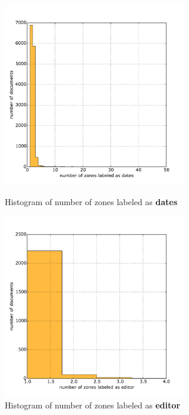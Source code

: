 \begin{figure}
\centering
\begin{minipage}[t!]{0.48\linewidth}
  \includegraphics[width=8cm]{plots/dates_histogram}
  \caption{Histogram of number of zones labeled as \textbf{dates}}
  \label{fig:dates_histogram}
\end{minipage}
\quad
\begin{minipage}[t!]{0.48\linewidth}
  \includegraphics[width=8cm]{plots/editor_histogram}
  \caption{Histogram of number of zones labeled as \textbf{editor}}
  \label{fig:editor_histogram}
\end{minipage}
\end{figure}

